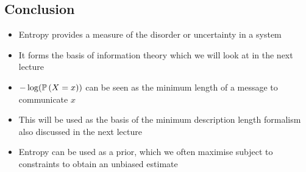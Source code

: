 
\begin{slide}
\section{Conclusion}

\begin{PauseHighLight}
  \begin{itemize}
  \item Entropy provides a measure of the disorder or uncertainty in a
    system\pause
  \item It forms the basis of information theory which we will look at
    in the next lecture\pause
  \item $-\log(\mathbb{P}\left( X=x \right))$ can be seen as the minimum length of a
    message to communicate $x$\pause
  \item This will be used as the basis of the minimum description
    length formalism also discussed in the next lecture\pause
  \item Entropy can be used as a prior, which we often maximise
    subject to constraints to obtain an unbiased estimate\pause
  \end{itemize}
\end{PauseHighLight}

\end{slide}






